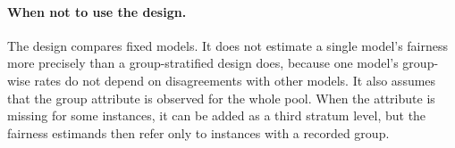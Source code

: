\paragraph{When not to use the design.} The design compares fixed models. It does not estimate a single model's fairness more precisely than a group-stratified design does, because one model's group-wise rates do not depend on disagreements with other models. It also assumes that the group attribute is observed for the whole pool. When the attribute is missing for some instances, it can be added as a third stratum level, but the fairness estimands then refer only to instances with a recorded group.
